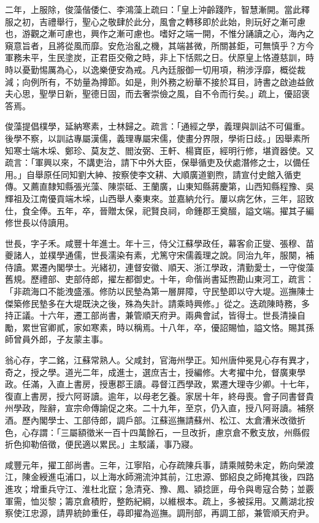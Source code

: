 \begin{pinyinscope}
二年，上服除，俊藻偕倭仁、李鴻藻上疏曰：「皇上沖齡踐阼，智慧漸開。當此釋服之初，吉禮舉行，聖心之敬肆於此分，風會之轉移即於此始，則玩好之漸可慮也，游觀之漸可慮也，興作之漸可慮也。嗜好之端一開，不惟分誦讀之心，海內之窺意旨者，且將從風而靡。安危治亂之機，其端甚微，所關甚鉅，可無慎乎？方今軍務未平，生民塗炭，正君臣交儆之時，非上下恬熙之日。伏原皇上恪遵慈訓，時時以憂勤惕厲為心，以逸樂便安為戒。凡內廷服御一切用項，稍涉浮靡，概從裁減；向例所有，不妨量為撙節。如是，則外務之紛華不接於耳目，詩書之啟迪益斂夫心思，聖學日新，聖德日固，而去奢崇儉之風，自不令而行矣。」疏上，優詔褒答焉。

俊藻提倡樸學，延納寒素，士林歸之。疏言：「通經之學，義理與訓詁不可偏重。後學不察，以訓詁專屬漢儒，義理專屬宋儒，使畫分界限，學術日歧。」因舉素所知寒士端木埰、鄭珍、莫友芝、閻汝弼、王軒、楊寶臣，經明行修，堪資器使。又疏言：「軍興以來，不講吏治，請下中外大臣，保舉循吏及伏處潛修之士，以備任用。」自舉原任同知劉大紳、按察使李文耕、大順廣道劉煦，請宣付史館入循吏傳。又薦直隸知縣張光藻、陳崇砥、王蘭廣，山東知縣蔣慶第，山西知縣程豫、吳輝祖及江南優貢端木埰，山西舉人秦東來。並嘉納允行。屢以病乞休，三年，詔致仕，食全俸。五年，卒，晉贈太保，祀賢良祠，命鍾郡王奠醊，謚文端。擢其子編修世長以侍讀用。

世長，字子禾。咸豐十年進士。年十三，侍父江蘇學政任，幕客俞正燮、張穆、苗夔諸人，並樸學通儒，世長濡染有素，尤篤守宋儒義理之說。同治九年，服闋，補侍讀。累遷內閣學士。光緒初，連督安徽、順天、浙江學政，清勤愛士，一守俊藻舊規。歷禮部、吏部侍郎，擢左都御史。十年，命偕尚書延煦勘山東河工，疏言：「非疏海口不能洩盛漲。修防以民墊為第一層屏障，守民墊即以守大堤。巡撫陳士傑築修民墊多在大堤既決之後，殊為失計。請乘時興修。」從之。迭疏陳時務，多持正議。十六年，遷工部尚書，兼管順天府尹。兩典會試，皆得士。世長清操自勵，累世官卿貳，家如寒素，時以稱焉。十八年，卒，優詔賜恤，謚文恪。賜其孫師曾員外郎，子友蒙主事。

翁心存，字二銘，江蘇常熟人。父咸封，官海州學正。知州唐仲冕見心存有異才，奇之，授之學。道光二年，成進士，選庶吉士，授編修。大考擢中允，督廣東學政。任滿，入直上書房，授惠郡王讀。尋督江西學政，累遷大理寺少卿。十七年，復直上書房，授六阿哥讀。逾年，以母老乞養。家居十年，終母喪。會子同書督貴州學政，陛辭，宣宗命傳諭促之來。二十九年，至京，仍入直，授八阿哥讀。補祭酒。歷內閣學士、工部侍郎，調戶部。江蘇巡撫請蘇州、松江、太倉漕米改徵折色，心存謂：「三屬額徵米一百十四萬餘石，一旦改折，慮京倉不敷支放，州縣假折色抑勒倍徵，便民適以累民。」主駁議，事乃寢。

咸豐元年，擢工部尚書。三年，江寧陷，心存疏陳兵事，請乘賊勢未定，飭向榮渡江，陳金綬進屯浦口，以上海水師溯流沖其前，江忠源、鄧紹良之師掩其後，四路進攻；增重兵守江、淮杜北竄；急清兗、豫、鳳、潁捻匪，毋令與粵寇合勢；並覈軍需，恤災黎；籌京倉積貯，整飭紀綱，以維根本。疏上，多被採用。又薦湖北按察使江忠源，請畀統帥重任，尋即擢為巡撫。調刑部，再調工部，兼管順天府尹。


\end{pinyinscope}
